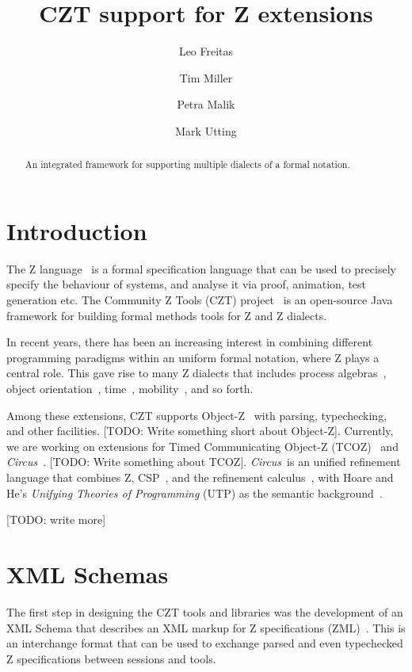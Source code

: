\documentclass{llncs}
\newcommand{\Circus}{{\sf\slshape Circus}}
\begin{document}
\title{CZT support for Z extensions}
\author{Leo Freitas \and Tim Miller \and Petra Malik \and Mark Utting}
\maketitle

\begin{abstract}
  An integrated framework for supporting multiple dialects of a formal
  notation.
\end{abstract}

\section{Introduction} \label{sec:intro}

  The Z language~\cite{isoz} is a formal specification language that
  can be used to precisely specify the behaviour of systems, and
  analyse it via proof, animation, test generation etc.  The Community
  Z Tools (CZT) project~\cite{czt} is an open-source Java framework
  for building formal methods tools for Z and Z dialects.

  In recent years, there has been an increasing interest in combining
  different programming paradigms within an uniform formal notation,
  where Z plays a central role. This gave rise to many Z dialects that
  includes process
  algebras~\cite{fischer-1998,fischer-2000,circus.sem:intro}, object
  orientation~\cite{oz,ohcircus},
  time~\cite{tcoz,circus.sem:real.time2},
  mobility~\cite{circus.sem:mobility}, and so forth.

  Among these extensions, CZT supports Object-Z~\cite{oz} with
  parsing, typechecking, and other facilities.  [TODO: Write something
  short about Object-Z].  Currently, we are working on extensions for
  Timed Communicating Object-Z (TCOZ)~\cite{tcoz} and
  \Circus~\cite{circus.sem:intro}.  [TODO: Write something about
  TCOZ].  \Circus\ is an unified refinement language that combines Z,
  CSP~\cite{csp.books:roscoe}, and the refinement
  calculus~\cite{fm.ref:morgan}, with Hoare and He's \textit{Unifying
  Theories of Programming} (UTP) as the semantic
  background~\cite{hoare.utp}.

  [TODO: write more]

\section{XML Schemas}

  The first step in designing the CZT tools and libraries was the
  development of an XML Schema that describes an XML markup for Z
  specifications (ZML)~\cite{UttEA:03}.  This is an interchange format
  that can be used to exchange parsed and even typechecked Z
  specifications between sessions and tools.
\end{document}
